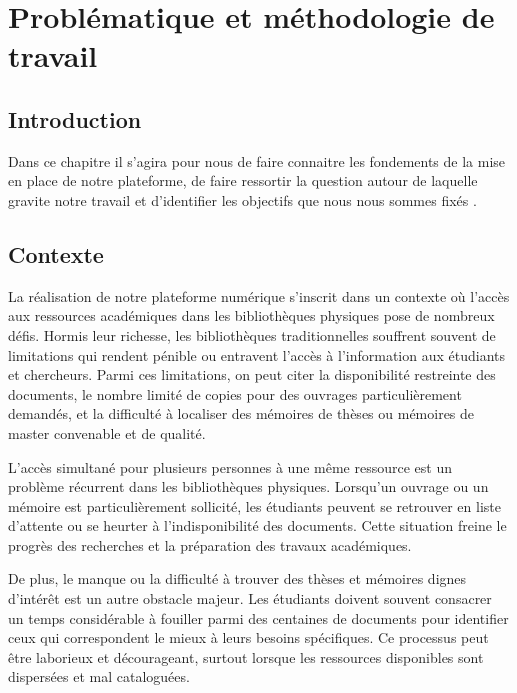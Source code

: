 \chapter{Problématique et méthodologie de travail}
\begin{spacing}{1.2}
\minitoc
\thispagestyle{MyStyle}
\end{spacing}
\newpage
\section*{Introduction}
Dans ce chapitre il s'agira pour nous de faire connaitre les fondements de la mise en place de notre plateforme, de faire ressortir la question autour de laquelle gravite notre travail et d'identifier les objectifs que nous nous sommes fixés . \par
\section{Contexte}
La réalisation de notre plateforme numérique s'inscrit dans un contexte où l'accès aux ressources académiques dans les bibliothèques physiques pose de nombreux défis. Hormis leur richesse, les bibliothèques traditionnelles souffrent souvent de limitations qui rendent pénible ou entravent l'accès à l'information aux étudiants et chercheurs. Parmi ces limitations, on peut citer la disponibilité restreinte des documents, le nombre limité de copies pour des ouvrages particulièrement demandés, et la difficulté à localiser des mémoires de thèses ou mémoires de master convenable et de qualité.\par
L'accès simultané pour plusieurs personnes à une même ressource est un problème récurrent dans les bibliothèques physiques. Lorsqu'un ouvrage ou un mémoire est particulièrement sollicité, les étudiants peuvent se retrouver en liste d'attente ou se heurter à l'indisponibilité des documents. Cette situation freine le progrès des recherches et la préparation des travaux académiques.\par
De plus, le manque ou la difficulté à trouver des thèses et mémoires dignes d'intérêt est un autre obstacle majeur. Les étudiants doivent souvent consacrer un temps considérable à fouiller parmi des centaines de documents pour identifier ceux qui correspondent le mieux à leurs besoins spécifiques. Ce processus peut être laborieux et décourageant, surtout lorsque les ressources disponibles sont dispersées et mal cataloguées.
\par
